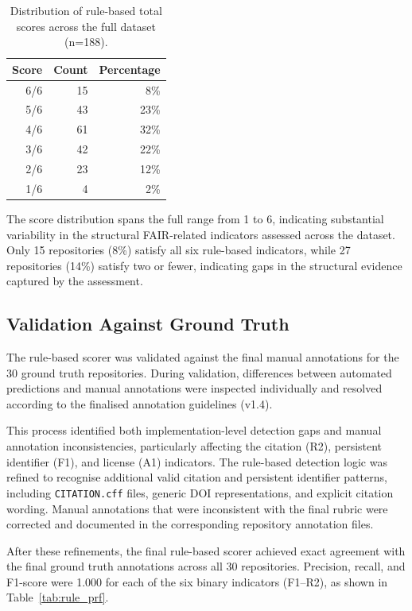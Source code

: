 \begin{table}[h]
\centering
\caption{Distribution of rule-based total scores across the full 
dataset (n=188).}
\label{tab:rb_dist}
\begin{tabular}{rrr}
\hline
\textbf{Score} & \textbf{Count} & \textbf{Percentage} \\
\hline
6/6 & 15  & 8\%  \\
5/6 & 43  & 23\% \\
4/6 & 61  & 32\% \\
3/6 & 42  & 22\% \\
2/6 & 23  & 12\% \\
1/6 & 4   & 2\%  \\
\hline
\end{tabular}
\end{table}

The score distribution spans the full range from 1 to 6, indicating
substantial variability in the structural FAIR-related indicators
assessed across the dataset. Only 15 repositories (8\%) satisfy all
six rule-based indicators, while 27 repositories (14\%) satisfy two
or fewer, indicating gaps in the structural evidence captured by the
assessment.


\subsection{Validation Against Ground Truth}

The rule-based scorer was validated against the final manual
annotations for the 30 ground truth repositories. During validation,
differences between automated predictions and manual annotations
were inspected individually and resolved according to the finalised
annotation guidelines (v1.4).

This process identified both implementation-level detection gaps and
manual annotation inconsistencies, particularly affecting the citation
(R2), persistent identifier (F1), and license (A1) indicators. The
rule-based detection logic was refined to recognise additional valid
citation and persistent identifier patterns, including
\texttt{CITATION.cff} files, generic DOI representations, and explicit
citation wording. Manual annotations that were inconsistent with the
final rubric were corrected and documented in the corresponding
repository annotation files.

After these refinements, the final rule-based scorer achieved exact
agreement with the final ground truth annotations across all 30
repositories. Precision, recall, and F1-score were 1.000 for each of
the six binary indicators (F1--R2), as shown in
Table~\ref{tab:rule_prf}.

